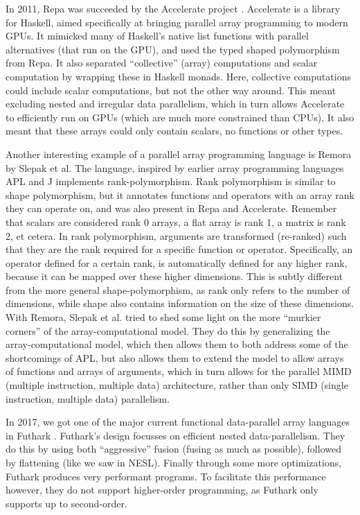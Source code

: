         In 2011, Repa was succeeded by the Accelerate project \cite{chakravarty2011accelerating}.
        Accelerate is a library for Haskell, aimed specifically at bringing parallel array programming to modern GPUs.
        It mimicked many of Haskell's native list functions with parallel alternatives (that run on the GPU), and used the typed shaped polymorphism from Repa.
        It also separated ``collective'' (array) computations and scalar computation by wrapping these in Haskell monads.
        Here, collective computations could include scalar computations, but not the other way around.
        This meant excluding nested and irregular data parallelism, which in turn allows Accelerate to efficiently run on GPUs (which are much more constrained than CPUs).
        It also meant that these arrays could only contain scalars, no functions or other types.
        
        Another interesting example of a parallel array programming language is Remora by Slepak et al. \cite{slepak2014array}
        The language, inspired by earlier array programming languages APL \cite{iverson1962programming} and J implements rank-polymorphism.
        Rank polymorphism is similar to shape polymorphism, but it annotates functions and operators with an array rank they can operate on, and was also present in Repa and Accelerate.
        Remember that scalars are considered rank 0 arrays, a flat array is rank 1, a matrix is rank 2, et cetera.
        In rank polymorphism, arguments are transformed (re-ranked) such that they are the rank required for a specific function or operator.
        Specifically, an operator defined for a certain rank, is automatically defined for any higher rank, because it can be mapped over these higher dimensions.
        This is subtly different from the more general shape-polymorphism, as rank only refers to the number of dimensions, while shape also contains information on the size of these dimensions.
        With Remora, Slepak et al. tried to shed some light on the more ``murkier corners'' of the array-computational model.
        They do this by generalizing the array-computational model, which then allows them to both address some of the shortcomings of APL, but also allows them to extend the model to allow arrays of functions and arrays of arguments, which in turn allows for the parallel MIMD (multiple instruction, multiple data) architecture, rather than only SIMD (single instruction, multiple data) parallelism.

        In 2017, we got one of the major current functional data-parallel array languages in Futhark \cite{henriksen2017futhark}.
        Futhark's design focusses on efficient nested data-parallelism.
        They do this by using both ``aggressive'' fusion (fusing as much as possible), followed by flattening (like we saw in NESL).
        Finally through some more optimizations, Futhark produces very performant programs.
        To facilitate this performance however, they do not support higher-order programming, as Futhark only supports up to second-order.

